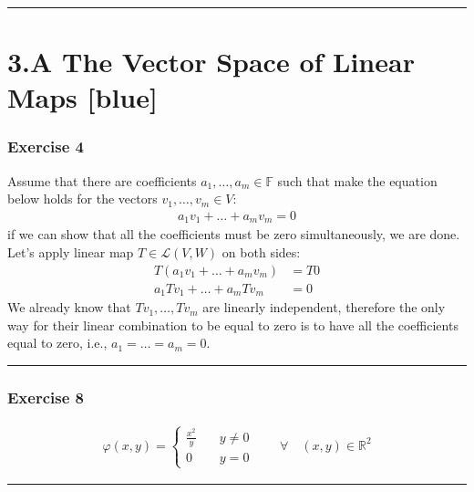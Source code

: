\documentclass[12pt, letterpaper]{scrartcl}
\newcommand{\R}{\mathbb{R}}
\newcommand{\F}{\mathbb{F}}
\begin{document}
\vskip1mm\hrule
\clearpage
\section*{3.A The Vector Space of Linear Maps \xrfill[2pt]{3pt}[blue]}
\subsubsection*{Exercise 4}
Assume that there are coefficients $a_1,\dots,a_m\in \F$ such that make the equation below holds for the vectors $v_1,\dots,v_m\in V$:
\begin{align*}
    a_1v_1+\dots+a_mv_m=0
\end{align*}
if we can show that all the coefficients must be zero simultaneously, we are done.
Let's apply linear map $T\in\mathcal{L}(V,W)$ on both sides:
\begin{align*}
    T(a_1v_1+\dots+a_mv_m)&=T0\\
    a_1Tv_1+\dots+a_mTv_m&=0
\end{align*}
We already know that $Tv_1,\dots,Tv_m$ are linearly independent, therefore the only way for their linear combination to be equal to zero is to have all the coefficients equal to zero, i.e., $a_1=\dots=a_m=0$.
\vskip1mm\hrule

\subsubsection*{Exercise 8}
\begin{align*}
    \varphi(x,y)=
    \begin{cases} 
      \frac{x^2}{y} &\quad y\neq0 \\
      0 &\quad y=0  
   \end{cases} \qquad\forall\quad(x,y)\in\R^2
\end{align*}
\vskip1mm\hrule
\end{document}
